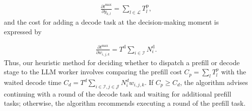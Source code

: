 \begin{align}
    \frac{\partial t^\text{max}}{\partial y_{k,l}} = \sum_{l \in \mathcal{L}} T^\text{p}_l,
\end{align}
and the cost for adding a decode task at the decision-making moment is expressed by

\begin{align}
    \frac{\partial t^\text{max}}{\partial w_{i,j,k}} = T^\text{d} \sum_{i\in \mathcal{I}} N_i^\text{d}.
\end{align}
Thus, our heuristic method for deciding whether to dispatch a prefill or decode stage to the LLM worker involves comparing the prefill cost $C_p = \sum_l T^p_l$ with the waited decode time $C_d = T^d \sum_{i\in \mathcal {I}, j\in \mathcal{J}} N_i^d w_{i,j,k}$. If $C_p \geq C_d$, the algorithm advises continuing with a round of the decode task and waiting for additional prefill tasks; otherwise, the algorithm recommends executing a round of the prefill task.









